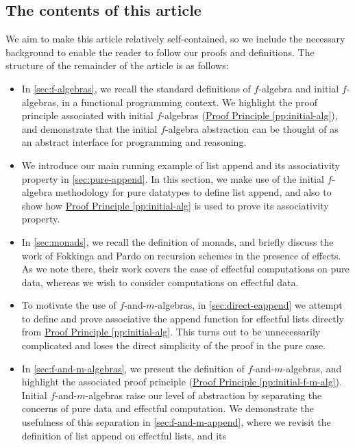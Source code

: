 \documentclass{jfp1}
\newcommand{\proofprinref}[1]{\hyperref[#1]{Proof Principle \ref*{#1}}}
\begin{document}
\subsection{The contents of this article}

We aim to make this article relatively self-contained, so we include the
necessary background to enable the reader to follow our proofs and
definitions. The structure of the remainder of the article is as
follows:
\begin{itemize}
\item In \autoref{sec:f-algebras}, we recall the standard definitions
  of $f$-algebra and initial $f$-algebras, in a functional programming
  context. We highlight the proof principle associated with initial
  $f$-algebras (\proofprinref{pp:initial-alg}), and demonstrate that the
  initial $f$-algebra abstraction can be thought of as an abstract
  interface for programming and reasoning.
\item We introduce our main running example of list append and its
  associativity property in \autoref{sec:pure-append}. In this
  section, we make use of the initial $f$-algebra methodology for pure
  datatypes to define list append, and also to show how
  \proofprinref{pp:initial-alg} is used to prove its associativity
  property.
\item In \autoref{sec:monads}, we recall the definition of monads, and
  briefly discuss the work of Fokkinga \cite{fokkinga94monadic} and
  Pardo \cite{pardo04combining} on recursion schemes in the presence
  of effects. As we note there, their work covers the case of
  effectful computations on pure data, whereas we wish to consider
  computations on effectful data.
\item To motivate the use of $f$-and-$m$-algebras, in
  \autoref{sec:direct-eappend} we attempt to define and prove
  associative the append function for effectful lists directly from
  \proofprinref{pp:initial-alg}. This turns out to be unnecessarily
  complicated and loses the direct simplicity of the proof in the pure
  case.
\item In \autoref{sec:f-and-m-algebras}, we present the definition of
  $f$-and-$m$-algebras, and highlight the associated proof principle
  (\proofprinref{pp:initial-f-m-alg}). Initial $f$-and-$m$-algebras
  raise our level of abstraction by separating the concerns of pure
  data and effectful computation. We demonstrate the usefulness of
  this separation in \autoref{sec:f-and-m-append}, where we revisit
  the definition of list append on effectful lists, and its

\end{itemize}
\end{document}
